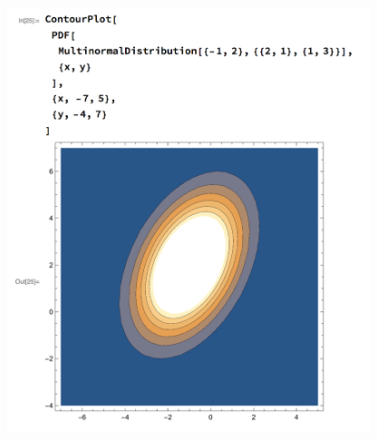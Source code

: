 \documentclass{article}
\begin{document}
\begin{enumerate}[label=(\alph*)]
    \begin{mdframed}
      \includegraphics[width=300pt]{img/hw03_2b.png}
    \end{mdframed}


\end{enumerate}
\end{document}
